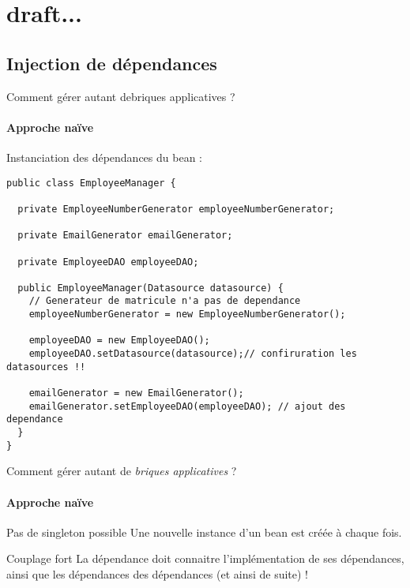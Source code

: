 
\section{draft...}


\subsection{Injection de dépendances}

\begin{frame}[containsverbatim]{Comment gérer autant debriques applicatives ?}
	\framesubtitle{Approche naïve}

	Instanciation des dépendances du bean :
	\begin{lstlisting}
public class EmployeeManager {

  private EmployeeNumberGenerator employeeNumberGenerator;

  private EmailGenerator emailGenerator;

  private EmployeeDAO employeeDAO;

  public EmployeeManager(Datasource datasource) {
    // Generateur de matricule n'a pas de dependance
    employeeNumberGenerator = new EmployeeNumberGenerator();

    employeeDAO = new EmployeeDAO();
    employeeDAO.setDatasource(datasource);// confiruration les datasources !!

    emailGenerator = new EmailGenerator();
    emailGenerator.setEmployeeDAO(employeeDAO); // ajout des dependance
  }
}
	\end{lstlisting}

\end{frame}

\begin{frame}{Comment gérer autant de \emph{briques applicatives} ?}
	\framesubtitle{Approche naïve}

	\begin{alertblock}{Pas de singleton possible}
	Une nouvelle instance d'un bean est créée à chaque fois.
	\end{alertblock}

	\pause
	\begin{alertblock}{Couplage fort}
	La dépendance doit connaitre l'implémentation de ses dépendances, ainsi que les dépendances des dépendances (et ainsi de suite) !
	\end{alertblock}

\end{frame}

